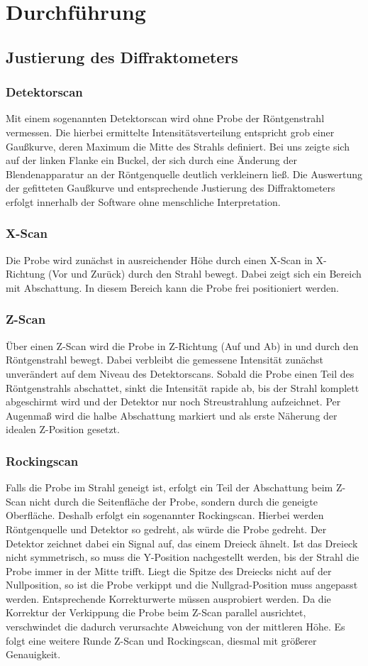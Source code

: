 \documentclass[12pt]{article}
\begin{document}
\section{Durchführung}\label{sec:durchfuehrung}
\subsection{Justierung des Diffraktometers}
\subsubsection{Detektorscan}
Mit einem sogenannten Detektorscan wird ohne Probe der Röntgenstrahl vermessen. Die hierbei ermittelte Intensitätsverteilung entspricht grob einer Gaußkurve, deren Maximum die Mitte des Strahls definiert. Bei uns zeigte sich auf der linken Flanke ein Buckel, der sich durch eine Änderung der Blendenapparatur an der Röntgenquelle deutlich verkleinern ließ. Die Auswertung der gefitteten Gaußkurve und entsprechende Justierung des Diffraktometers erfolgt innerhalb der Software ohne menschliche Interpretation.
\subsubsection{X-Scan}
Die Probe wird zunächst in ausreichender Höhe durch einen X-Scan in X-Richtung (Vor und Zurück) durch den Strahl bewegt. Dabei zeigt sich ein Bereich mit Abschattung. In diesem Bereich kann die Probe frei positioniert werden.
\subsubsection{Z-Scan}
Über einen Z-Scan wird die Probe in Z-Richtung (Auf und Ab) in und durch den Röntgenstrahl bewegt. Dabei verbleibt die gemessene Intensität zunächst unverändert auf dem Niveau des Detektorscans. Sobald die Probe einen Teil des Röntgenstrahls abschattet, sinkt die Intensität rapide ab, bis der Strahl komplett abgeschirmt wird und der Detektor nur noch Streustrahlung aufzeichnet. Per Augenmaß wird die halbe Abschattung markiert und als erste Näherung der idealen Z-Position gesetzt.
\subsubsection{Rockingscan}
Falls die Probe im Strahl geneigt ist, erfolgt ein Teil der Abschattung beim Z-Scan nicht durch die Seitenfläche der Probe, sondern durch die geneigte Oberfläche. Deshalb erfolgt ein sogenannter Rockingscan. Hierbei werden Röntgenquelle und Detektor so gedreht, als würde die Probe gedreht. Der Detektor zeichnet dabei ein Signal auf, das einem Dreieck ähnelt. Ist das Dreieck nicht symmetrisch, so muss die Y-Position nachgestellt werden, bis der Strahl die Probe immer in der Mitte trifft. Liegt die Spitze des Dreiecks nicht auf der Nullposition, so ist die Probe verkippt und die Nullgrad-Position muss angepasst werden. Entsprechende Korrekturwerte müssen ausprobiert werden.
Da die Korrektur der Verkippung die Probe beim Z-Scan parallel ausrichtet, verschwindet die dadurch verursachte Abweichung von der mittleren Höhe. Es folgt eine weitere Runde Z-Scan und Rockingscan, diesmal mit größerer Genauigkeit.
\end{document}
